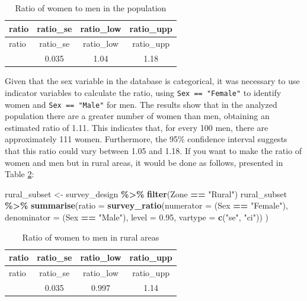 \documentclass[
  english,
  12pt,
]{book}
\newenvironment{Shaded}{\begin{snugshade}}{\end{snugshade}}
\newcommand{\AttributeTok}[1]{\textcolor[rgb]{0.13,0.29,0.53}{#1}}
\newcommand{\FloatTok}[1]{\textcolor[rgb]{0.00,0.00,0.81}{#1}}
\newcommand{\FunctionTok}[1]{\textcolor[rgb]{0.13,0.29,0.53}{\textbf{#1}}}
\newcommand{\NormalTok}[1]{#1}
\newcommand{\OtherTok}[1]{\textcolor[rgb]{0.56,0.35,0.01}{#1}}
\newcommand{\SpecialCharTok}[1]{\textcolor[rgb]{0.81,0.36,0.00}{\textbf{#1}}}
\newcommand{\StringTok}[1]{\textcolor[rgb]{0.31,0.60,0.02}{#1}}
\begin{document}
\begin{longtable}[]{@{}lccc@{}}
\caption{\label{tab:tab-razon-sexo}Ratio of women to men in the population}\tabularnewline
\toprule\noalign{}
ratio & ratio\_se & ratio\_low & ratio\_upp \\
\midrule\noalign{}
\endfirsthead
\toprule\noalign{}
ratio & ratio\_se & ratio\_low & ratio\_upp \\
\midrule\noalign{}
\endhead
\bottomrule\noalign{}
\endlastfoot
1.11 & 0.035 & 1.04 & 1.18 \\
\end{longtable}

Given that the sex variable in the database is categorical, it was necessary to use indicator variables to calculate the ratio, using \texttt{Sex\ ==\ "Female"} to identify women and \texttt{Sex\ ==\ "Male"} for men. The results show that in the analyzed population there are a greater number of women than men, obtaining an estimated ratio of 1.11. This indicates that, for every 100 men, there are approximately 111 women. Furthermore, the 95\% confidence interval suggests that this ratio could vary between 1.05 and 1.18. If you want to make the ratio of women and men but in rural areas, it would be done as follows, presented in Table \ref{tab:tab-razon-sexo-rural}:

\begin{Shaded}
\begin{Highlighting}[]
\NormalTok{rural\_subset }\OtherTok{\textless{}{-}}\NormalTok{ survey\_design }\SpecialCharTok{\%\textgreater{}\%}
  \FunctionTok{filter}\NormalTok{(Zone }\SpecialCharTok{==} \StringTok{"Rural"}\NormalTok{)}
\NormalTok{rural\_subset }\SpecialCharTok{\%\textgreater{}\%}
  \FunctionTok{summarise}\NormalTok{(}\AttributeTok{ratio =} \FunctionTok{survey\_ratio}\NormalTok{(}\AttributeTok{numerator =}\NormalTok{ (Sex }\SpecialCharTok{==} \StringTok{"Female"}\NormalTok{),}
                                  \AttributeTok{denominator =}\NormalTok{ (Sex }\SpecialCharTok{==} \StringTok{"Male"}\NormalTok{),}
                                  \AttributeTok{level =} \FloatTok{0.95}\NormalTok{,}
                                  \AttributeTok{vartype =} \FunctionTok{c}\NormalTok{(}\StringTok{"se"}\NormalTok{, }\StringTok{"ci"}\NormalTok{))}
\NormalTok{            )}
\end{Highlighting}
\end{Shaded}

\begin{longtable}[]{@{}lccc@{}}
\caption{\label{tab:tab-razon-sexo-rural}Ratio of women to men in rural areas}\tabularnewline
\toprule\noalign{}
ratio & ratio\_se & ratio\_low & ratio\_upp \\
\midrule\noalign{}
\endfirsthead
\toprule\noalign{}
ratio & ratio\_se & ratio\_low & ratio\_upp \\
\midrule\noalign{}
\endhead
\bottomrule\noalign{}
\endlastfoot
1.07 & 0.035 & 0.997 & 1.14 \\
\end{longtable}
\end{document}
